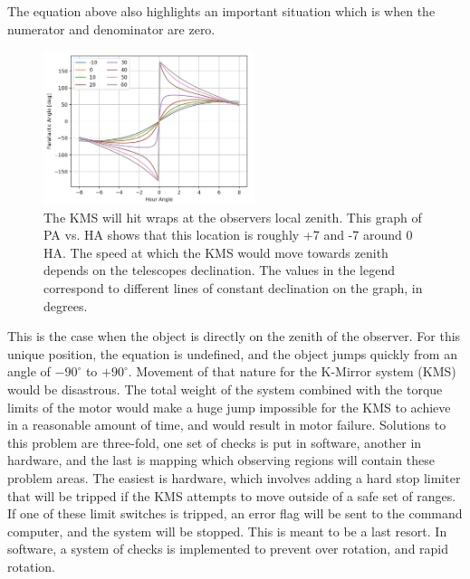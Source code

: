 \documentclass[manuscript]{aastex}
\begin{document}
The equation above also highlights an important situation which is when the numerator and denominator are zero. 
\begin{figure}
\vspace{-0.8cm}
  \begin{center}
    \includegraphics[width=0.55\textwidth]{km6.png}
  \end{center}
  \caption[Parallactic Angle Versus Hour Angle]{The KMS will hit wraps at the observers local zenith. This graph of PA vs. HA shows that this location is roughly +7 and -7 around 0 HA. The speed at which the KMS would move towards zenith depends on the telescopes declination. The values in the legend correspond to different lines of constant declination on the graph, in degrees.}
  \label{fig:km6}
\end{figure}
This is the case when the object is directly on the zenith of the observer. For this unique position, the equation is undefined, and the object jumps quickly from an angle of $- 90^{\circ}$ to $+ 90^{\circ}$. Movement of that nature for the K-Mirror system (KMS) would be disastrous. The total weight of the system combined with the torque limits of the motor would make a huge jump impossible for the KMS to achieve in a reasonable amount of time, and would result in motor failure. Solutions to this problem are three-fold, one set of checks is put in software, another in hardware, and the last is mapping which observing regions will contain these problem areas. The easiest is hardware, which involves adding a hard stop limiter that will be tripped if the KMS attempts to move outside of a safe set of ranges. If one of these limit switches is tripped, an error flag will be sent to the command computer, and the system will be stopped. This is meant to be a last resort. In software, a system of checks is implemented to prevent over rotation, and rapid rotation.
\end{document}
